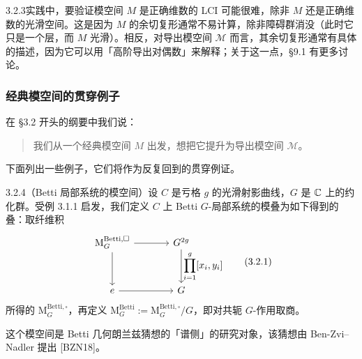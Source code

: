 \begin{rem}{3.2.3}实践中，要验证模空间 $M$ 是正确维数的 LCI 可能很难，除非 $M$ 还是正确维数的光滑空间。这是因为 $M$ 的余切复形通常不易计算，除非障碍群消没（此时它只是一个层，而 $M$ 光滑）。相反，对导出模空间 $\mathcal M$ 而言，其余切复形通常有具体的描述，因为它可以用「高阶导出对偶数」来解释；关于这一点，§9.1 有更多讨论。
\end{rem}

\subsubsection{经典模空间的贯穿例子}

在 §3.2 开头的纲要中我们说：
\begin{quote}
我们从一个经典模空间 $M$ 出发，想把它提升为导出模空间 $\mathcal M$。
\end{quote}
下面列出一些例子，它们将作为反复回到的贯穿例证。

\begin{exam}{3.2.4}（Betti 局部系统的模空间）设 $C$ 是亏格 $g$ 的光滑射影曲线，$G$ 是 $\mathbb{C}$ 上的约化群。受例 3.1.1 启发，我们定义 $C$ 上 Betti $G$-局部系统的模叠为如下得到的叠：取纤维积
\begin{equation}
\begin{tikzcd}[column sep=large, row sep=3.2em]
\mathrm{M}^{\mathrm{Betti},\square}_G \arrow[r] \arrow[d] & G^{2g} \arrow[d, "{\displaystyle\prod_{i=1}^{g}[x_i,y_i]}"] \\
e \arrow[r] & G
\end{tikzcd}
\tag{3.2.1}\label{eq:a6-02-3-2-1}
\end{equation}
所得的 $\mathrm{M}^{\mathrm{Betti},\square}_G$，再定义 $\mathrm{M}^{\mathrm{Betti}}_G:=\mathrm{M}^{\mathrm{Betti},\square}_G/G$，即对共轭 $G$-作用取商。

这个模空间是 Betti 几何朗兰兹猜想的「谱侧」的研究对象，该猜想由 Ben-Zvi–Nadler 提出 [BZN18]。
\end{exam}


